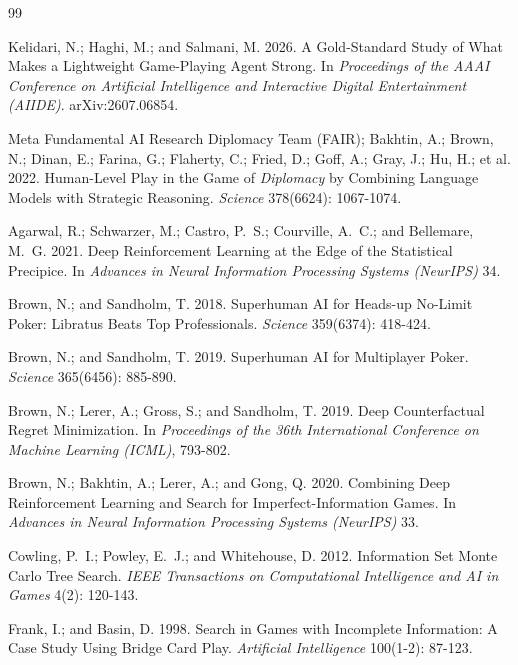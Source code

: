 \begin{thebibliography}{99}

Kelidari, N.; Haghi, M.; and Salmani, M. 2026. \newblock A Gold-Standard Study of What Makes a Lightweight Game-Playing Agent Strong. \newblock In \emph{Proceedings of the AAAI Conference on Artificial Intelligence and Interactive Digital Entertainment (AIIDE)}. arXiv:2607.06854.

Meta Fundamental AI Research Diplomacy Team (FAIR); Bakhtin, A.; Brown, N.; Dinan, E.; Farina, G.; Flaherty, C.; Fried, D.; Goff, A.; Gray, J.; Hu, H.; et al. 2022. Human-Level Play in the Game of \emph{Diplomacy} by Combining Language Models with Strategic Reasoning. \emph{Science} 378(6624): 1067-1074.

Agarwal, R.; Schwarzer, M.; Castro, P.~S.; Courville, A.~C.; and Bellemare, M.~G. 2021. Deep Reinforcement Learning at the Edge of the Statistical Precipice. In \emph{Advances in Neural Information Processing Systems (NeurIPS)} 34.

Brown, N.; and Sandholm, T. 2018. Superhuman AI for Heads-up No-Limit Poker: Libratus Beats Top Professionals. \emph{Science} 359(6374): 418-424.

Brown, N.; and Sandholm, T. 2019. Superhuman AI for Multiplayer Poker. \emph{Science} 365(6456): 885-890.

Brown, N.; Lerer, A.; Gross, S.; and Sandholm, T. 2019. Deep Counterfactual Regret Minimization. In \emph{Proceedings of the 36th International Conference on Machine Learning (ICML)}, 793-802.

Brown, N.; Bakhtin, A.; Lerer, A.; and Gong, Q. 2020. Combining Deep Reinforcement Learning and Search for Imperfect-Information Games. In \emph{Advances in Neural Information Processing Systems (NeurIPS)} 33.

Cowling, P.~I.; Powley, E.~J.; and Whitehouse, D. 2012. Information Set Monte Carlo Tree Search. \emph{IEEE Transactions on Computational Intelligence and AI in Games} 4(2): 120-143.

Frank, I.; and Basin, D. 1998. Search in Games with Incomplete Information: A Case Study Using Bridge Card Play. \emph{Artificial Intelligence} 100(1-2): 87-123.


\end{thebibliography}
